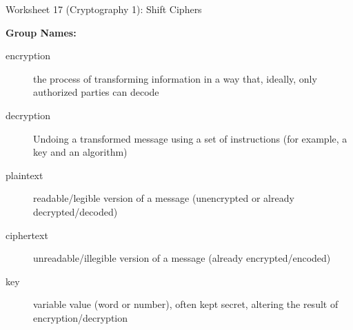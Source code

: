 \documentclass[12pt]{article}
\begin{document}
\begin{center}
{\Large  Worksheet 17 (Cryptography 1): Shift  Ciphers}
\end{center}



\noindent \textbf{Group Names:} \hrulefill \\
\begin{description}
\item[encryption] the process of transforming information in a way that, ideally, only authorized parties can decode
\item[decryption] Undoing a transformed message using a set of instructions (for example, a key and an algorithm)
\item[plaintext] readable/legible version of a message (unencrypted or already decrypted/decoded)
\item[ciphertext] unreadable/illegible version of a message (already encrypted/encoded)
\item[key] variable value (word or number), often kept secret, altering the result of encryption/decryption
\end{description}
\end{document}
